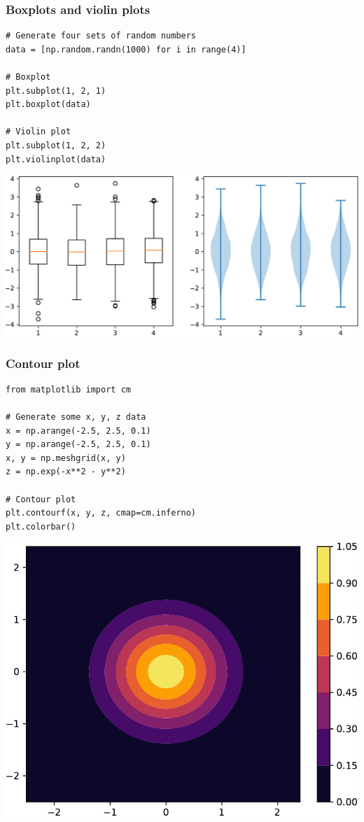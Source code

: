 \documentclass[pdf]{beamer}
\begin{document}
\begin{frame}[fragile]
\frametitle{Boxplots and violin plots}

\begin{lstlisting}[style=python]
# Generate four sets of random numbers
data = [np.random.randn(1000) for i in range(4)]

# Boxplot
plt.subplot(1, 2, 1)
plt.boxplot(data)

# Violin plot
plt.subplot(1, 2, 2)
plt.violinplot(data)
\end{lstlisting}

\vspace{-0.6cm}
\begin{center}
	\includegraphics[width=.72\textwidth]{plot4.pdf}
\end{center}

\end{frame}

\begin{frame}[fragile]
\frametitle{Contour plot}

\tiny
\begin{lstlisting}[style=python]
from matplotlib import cm

# Generate some x, y, z data
x = np.arange(-2.5, 2.5, 0.1)
y = np.arange(-2.5, 2.5, 0.1)
x, y = np.meshgrid(x, y)
z = np.exp(-x**2 - y**2)

# Contour plot
plt.contourf(x, y, z, cmap=cm.inferno)
plt.colorbar()
\end{lstlisting}

\vspace{-0.8cm}
\begin{center}
	\includegraphics[width=.42\textwidth]{plot5.pdf}
\end{center}

\end{frame}
\end{document}
